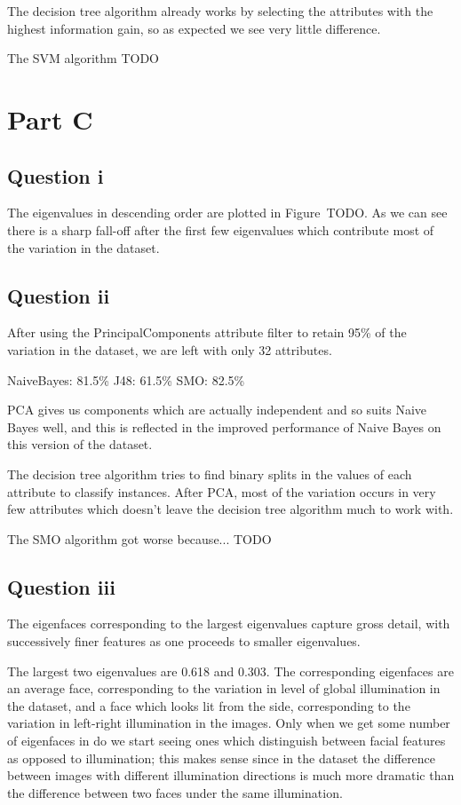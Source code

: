 \documentclass[a4paper]{article}
\begin{document}
The decision tree algorithm already works by selecting the attributes with the highest information gain, so as expected we see very little difference.

The SVM algorithm TODO

\section*{Part C}
\subsection*{Question i}

The eigenvalues in descending order are plotted in Figure~TODO. As we can see there is a sharp fall-off after the first few eigenvalues which contribute most of the variation in the dataset.

\subsection*{Question ii}

After using the PrincipalComponents attribute filter to retain 95\% of the variation in the dataset, we are left with only 32 attributes.

NaiveBayes: 81.5\%
J48: 61.5\%
SMO: 82.5\%

PCA gives us components which are actually independent and so suits Naive Bayes well, and this is reflected in the improved performance of Naive Bayes on this version of the dataset.

The decision tree algorithm tries to find binary splits in the values of each attribute to classify instances. After PCA, most of the variation occurs in very few attributes which doesn't leave the decision tree algorithm much to work with.

The SMO algorithm got worse because... TODO

\subsection*{Question iii}

The eigenfaces corresponding to the largest eigenvalues capture gross detail, with successively finer features as one proceeds to smaller eigenvalues.

The largest two eigenvalues are 0.618 and 0.303. The corresponding eigenfaces are an average face, corresponding to the variation in level of global illumination in the dataset, and a face which looks lit from the side, corresponding to the variation in left-right illumination in the images. Only when we get some number of eigenfaces in do we start seeing ones which distinguish between facial features as opposed to illumination; this makes sense since in the dataset the difference between images with different illumination directions is much more dramatic than the difference between two faces under the same illumination.
\end{document}
